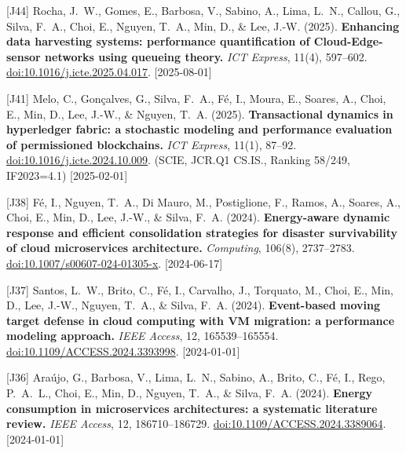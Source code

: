 {\begin{pubenumerate}
\item {\color{blue}[J44]} Rocha, J.\ W., Gomes, E., Barbosa, V., Sabino, A., Lima, L.\ N., Callou, G., Silva, F.\ A., Choi, E., Nguyen, T.\ A., Min, D., \& Lee, J.-W. (2025). 
  \textbf{Enhancing data harvesting systems: performance quantification of Cloud-Edge-sensor networks using queueing theory.} 
  \textit{ICT Express}, 11(4), 597--602. 
  \href{https://doi.org/10.1016/j.icte.2025.04.017}{doi:10.1016/j.icte.2025.04.017}. [2025-08-01]

\item {\color{blue}[J41]} Melo, C., Gon\c{c}alves, G., Silva, F.\ A., F\'e, I., Moura, E., Soares, A., Choi, E., Min, D., Lee, J.-W., \& Nguyen, T.\ A. (2025). 
  \textbf{Transactional dynamics in hyperledger fabric: a stochastic modeling and performance evaluation of permissioned blockchains.} 
  \textit{ICT Express}, 11(1), 87--92. 
  \href{https://doi.org/10.1016/j.icte.2024.10.009}{doi:10.1016/j.icte.2024.10.009}. 
  (SCIE, JCR.Q1 CS.IS., Ranking 58/249, IF2023=4.1) [2025-02-01]

\item {\color{blue}[J38]} F\'e, I., Nguyen, T.\ A., Di Mauro, M., Postiglione, F., Ramos, A., Soares, A., Choi, E., Min, D., Lee, J.-W., \& Silva, F.\ A. (2024). 
  \textbf{Energy-aware dynamic response and efficient consolidation strategies for disaster survivability of cloud microservices architecture.} 
  \textit{Computing}, 106(8), 2737--2783. 
  \href{https://doi.org/10.1007/s00607-024-01305-x}{doi:10.1007/s00607-024-01305-x}. [2024-06-17]

\item {\color{blue}[J37]} Santos, L.\ W., Brito, C., F\'e, I., Carvalho, J., Torquato, M., Choi, E., Min, D., Lee, J.-W., Nguyen, T.\ A., \& Silva, F.\ A. (2024). 
  \textbf{Event-based moving target defense in cloud computing with VM migration: a performance modeling approach.} 
  \textit{IEEE Access}, 12, 165539--165554. 
  \href{https://doi.org/10.1109/ACCESS.2024.3393998}{doi:10.1109/ACCESS.2024.3393998}. [2024-01-01]

\item {\color{blue}[J36]} Ara\'ujo, G., Barbosa, V., Lima, L.\ N., Sabino, A., Brito, C., F\'e, I., Rego, P.\ A.\ L., Choi, E., Min, D., Nguyen, T.\ A., \& Silva, F.\ A. (2024). 
  \textbf{Energy consumption in microservices architectures: a systematic literature review.} 
  \textit{IEEE Access}, 12, 186710--186729. 
  \href{https://doi.org/10.1109/ACCESS.2024.3389064}{doi:10.1109/ACCESS.2024.3389064}. [2024-01-01]


\end{pubenumerate}}
